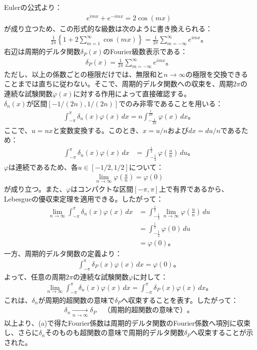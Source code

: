 \documentclass[platex,dvipdfmx,a4paper]{jsarticle}
\begin{document}
  Eulerの公式より：
  \begin{align*}
    e^{imx}+e^{-imx}=2\cos(mx)
  \end{align*}
  が成り立つため、この形式的な級数は次のように書き換えられる：
  \begin{align*}
    \frac{1}{2\pi}\left\{1+2\sum_{m=1}^{\infty}\cos(mx)\right\}
    =\frac{1}{2\pi}\sum_{m=-\infty}^{\infty}e^{imx}。
  \end{align*}
  右辺は周期的デルタ関数$\delta_P(x)$のFourier級数表示である：
  \begin{align*}
    \delta_P(x)=\frac{1}{2\pi}\sum_{m=-\infty}^{\infty}e^{imx}。
  \end{align*}
  ただし、以上の係数ごとの極限だけでは、無限和と$n\longrightarrow\infty$の極限を交換できることまでは直ちに従わない。そこで、周期的デルタ関数への収束を、周期$2\pi$の連続な試験関数$\varphi(x)$に対する作用によって直接確認する。\\
  $\delta_n(x)$が区間$[-1/(2n),1/(2n)]$でのみ非零であることを用いる：
  \begin{align*}
    \int_{-\pi}^{\pi}\delta_n(x)\varphi(x)\,dx
    =n\int_{-\frac{1}{2n}}^{\frac{1}{2n}}\varphi(x)\,dx。
  \end{align*}
  ここで、$u=nx$と変数変換する。このとき、$x=u/n$および$dx=du/n$であるため：
  \begin{align*}
    \int_{-\pi}^{\pi}\delta_n(x)\varphi(x)\,dx
    &=\int_{-\frac{1}{2}}^{\frac{1}{2}}\varphi\left(\frac{u}{n}\right)\,du。
  \end{align*}
  $\varphi$は連続であるため、各$u\in[-1/2,1/2]$について：
  \begin{align*}
    \lim_{n\to\infty}\varphi\left(\frac{u}{n}\right)=\varphi(0)
  \end{align*}
  が成り立つ。また、$\varphi$はコンパクトな区間$[-\pi,\pi]$上で有界であるから、Lebesgueの優収束定理を適用できる。したがって：
  \begin{align*}
    \lim_{n\to\infty}\int_{-\pi}^{\pi}\delta_n(x)\varphi(x)\,dx
    &=\int_{-\frac{1}{2}}^{\frac{1}{2}}\lim_{n\to\infty}\varphi\left(\frac{u}{n}\right)\,du\\
    &=\int_{-\frac{1}{2}}^{\frac{1}{2}}\varphi(0)\,du\\
    &=\varphi(0)。
  \end{align*}
  一方、周期的デルタ関数の定義より：
  \begin{align*}
    \int_{-\pi}^{\pi}\delta_P(x)\varphi(x)\,dx=\varphi(0)。
  \end{align*}
  よって、任意の周期$2\pi$の連続な試験関数$\varphi$に対して：
  \begin{align*}
    \lim_{n\to\infty}\int_{-\pi}^{\pi}\delta_n(x)\varphi(x)\,dx
    =\int_{-\pi}^{\pi}\delta_P(x)\varphi(x)\,dx。
  \end{align*}
  これは、$\delta_n$が周期的超関数の意味で$\delta_P$へ収束することを表す。したがって：
  \begin{align*}
    \delta_n\xrightarrow[n\to\infty]{}\delta_P
    \quad\text{（周期的超関数の意味で）}。
  \end{align*}
  以上より、(a)で得たFourier係数は周期的デルタ関数のFourier係数へ項別に収束し、さらに$\delta_n$そのものも超関数の意味で周期的デルタ関数$\delta_P$へ収束することが示された。
\end{document}
